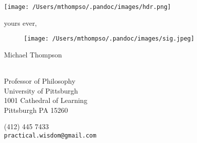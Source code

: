 \documentclass[leqno,13pt]{scrartcl}
\author{}
\begin{document}
\centerline{\texttt{[image: /Users/mthompso/.pandoc/images/hdr.png]}}

\vspace*{-6.5 in}







yours ever,

\begin{figure}[htbp]
\texttt{[image: /Users/mthompso/.pandoc/images/sig.jpeg]}
\end{figure}

Michael Thompson

~\\Professor of Philosophy\\University of Pittsburgh\\1001 Cathedral of
Learning\\Pittsburgh PA 15260

(412) 445 7433\\\texttt{practical.wisdom@gmail.com}
\end{document}
